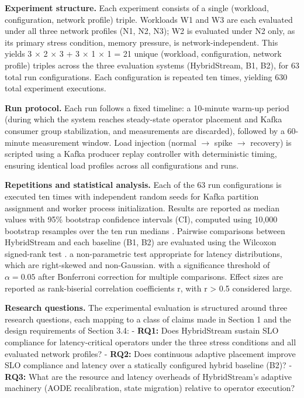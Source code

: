 \documentclass[preprint,review,12pt]{elsarticle}
\begin{document}
\textbf{Experiment structure.} Each experiment consists of a single (workload, configuration, network profile) triple. Workloads W1 and W3 are each evaluated under all three network profiles (N1, N2, N3); W2 is evaluated under N2 only, as its primary stress condition, memory pressure, is network-independent. This yields 3 $\times$ 2 $\times$ 3 + 3 $\times$ 1 $\times$ 1 = 21 unique (workload, configuration, network profile) triples across the three evaluation systems (HybridStream, B1, B2), for 63 total run configurations. Each configuration is repeated ten times, yielding 630 total experiment executions.

\textbf{Run protocol.} Each run follows a fixed timeline: a 10-minute warm-up period (during which the system reaches steady-state operator placement and Kafka consumer group stabilization, and measurements are discarded), followed by a 60-minute measurement window. Load injection (normal $\to$ spike $\to$ recovery) is scripted using a Kafka producer replay controller with deterministic timing, ensuring identical load profiles across all configurations and runs.

\textbf{Repetitions and statistical analysis.} Each of the 63 run configurations is executed ten times with independent random seeds for Kafka partition assignment and worker process initialization. Results are reported as median values with 95\% bootstrap confidence intervals (CI), computed using 10,000 bootstrap resamples over the ten run medians \cite{efron1993bootstrap}. Pairwise comparisons between HybridStream and each baseline (B1, B2) are evaluated using the Wilcoxon signed-rank test \cite{wilcoxon1945}. a non-parametric test appropriate for latency distributions, which are right-skewed and non-Gaussian. with a significance threshold of $\alpha = 0.05$ after Bonferroni correction for multiple comparisons. Effect sizes are reported as rank-biserial correlation coefficients r, with \textbar r\textbar{} > 0.5 considered large.

\textbf{Research questions.} The experimental evaluation is structured around three research questions, each mapping to a class of claims made in Section 1 and the design requirements of Section 3.4: - \textbf{RQ1:} Does HybridStream sustain SLO compliance for latency-critical operators under the three stress conditions and all evaluated network profiles? - \textbf{RQ2:} Does continuous adaptive placement improve SLO compliance and latency over a statically configured hybrid baseline (B2)? - \textbf{RQ3:} What are the resource and latency overheads of HybridStream's adaptive machinery (AODE recalibration, state migration) relative to operator execution?
\end{document}
